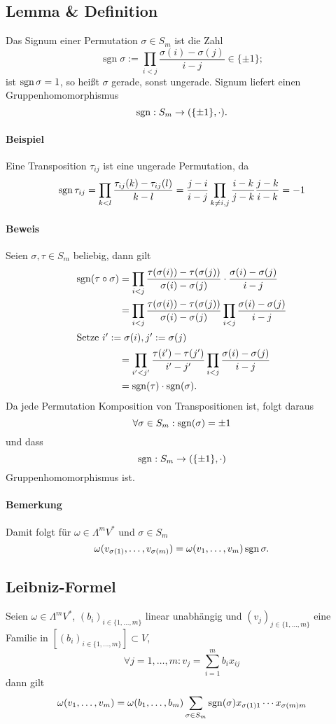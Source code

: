 \subsection{Lemma \& Definition}
	\begin{Definition}
	Das Signum einer Permutation $ \sigma\in S_m $ ist die Zahl
		\[ \operatorname{sgn}\sigma := \prod_{i<j} \frac{\sigma(i)-\sigma(j)}{i-j}\in \{\pm 1\}; \]
	ist $ \operatorname{sgn}\sigma = 1 $, so heißt $ \sigma $ gerade, sonst ungerade. Signum liefert einen Gruppenhomomorphismus
		\[ \operatorname{sgn}: S_m\to (\{\pm 1\},\cdot). \]
	\end{Definition}
\paragraph{Beispiel}
	Eine Transposition $ \tau_{ij} $ ist eine ungerade Permutation, da
		\[ \operatorname{sgn}\tau_{ij} = \prod_{k<l}\frac{\tau_{ij}(k)-\tau_{ij}(l)}{k-l} = \frac{j-i}{i-j}\prod_{k\neq i,j}\frac{i-k}{j-k}\frac{j-k}{i-k} = -1 \]

\paragraph{Beweis}
	Seien $ \sigma,\tau\in S_m $ beliebig, dann gilt
	\begin{align*} \operatorname{sgn}(\tau\circ\sigma) &= \prod_{i<j}\frac{\tau(\sigma(i))-\tau(\sigma(j))}{\sigma(i)-\sigma(j)}\cdot\frac{\sigma(i)-\sigma(j)}{i-j} \\
	&= \prod_{i<j}\frac{\tau(\sigma(i))-\tau(\sigma(j))}{\sigma(i)-\sigma(j)}\prod_{i<j}\frac{\sigma(i)-\sigma(j)}{i-j}\\
	\intertext{Setze $i':=\sigma(i), j':=\sigma(j) $}
	&=\prod_{i'<j'}\frac{\tau(i')-\tau(j')}{i'-j'}\prod_{i<j}\frac{\sigma(i)-\sigma(j)}{i-j}\\
	&= \operatorname{sgn}(\tau)\cdot \operatorname{sgn}(\sigma).
	\end{align*}
	Da jede Permutation Komposition von Transpositionen ist, folgt daraus
		\[ \forall \sigma \in S_m:\operatorname{sgn}(\sigma) = \pm 1 \]
	und dass
		\[ \operatorname{sgn}:S_m \to (\{\pm 1\},\cdot) \]
	Gruppenhomomorphismus ist.
\paragraph{Bemerkung}
	Damit folgt für $ \omega\in \Lambda^mV^* $ und $ \sigma \in S_m $
		\[ \omega(v_{\sigma(1)},\dots,v_{\sigma(m)}) =\omega(v_1,\dots,v_m)\operatorname{sgn}\sigma. \]
\subsection{Leibniz-Formel}
	\begin{Satz}
		Seien $ \omega\in \Lambda^mV^* $, $ (b_i)_{i\in \{1,\dots,m\}} $ linear unabhängig und $ (v_j)_{j\in \{1,\dots,m\}} $ eine Familie in $ [(b_i)_{i\in\{1,\dots,m\}}] \subset V$,
		\[ \forall j=1,\dots,m: v_j = \sum_{i=1}^{m}b_ix_{ij} \]
	dann gilt
		\[ \omega(v_1,\dots,v_m)=\omega(b_1,\dots,b_m)\sum_{\sigma\in S_m}\operatorname{sgn}(\sigma)x_{\sigma(1)1} \cdots x_{\sigma(m)m} \]
	\end{Satz}
